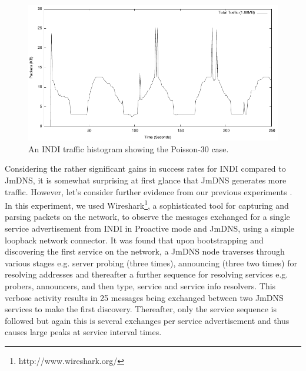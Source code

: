 \begin{figure}[htb]
\centering
\includegraphics[scale=1.0]{indi30packet-distribution.pdf}
\caption{An INDI traffic histogram showing the Poisson-30 case.   } 
\label{indi:fig:indi-30-traffic}
\end{figure}


 Considering the rather significant gains in success rates for INDI compared to JmDNS, it is somewhat surprising at first glance that JmDNS generates more traffic.  However, let's consider further evidence from our previous experiments \cite{Macker2011}.  In this experiment, we used Wireshark\footnote{http://www.wireshark.org/}, a sophisticated tool for capturing and parsing packets on the network, to observe the messages exchanged for a single service advertisement from INDI in Proactive mode and JmDNS, using a simple loopback network connector.  It was found that upon bootstrapping and discovering the first service on the network, a JmDNS node traverses through various stages e.g. server probing (three times), announcing (three two times) for resolving addresses and thereafter a further sequence for resolving services e.g. probers, announcers, and then type, service and service info resolvers.   This verbose activity results in 25 messages being exchanged between two JmDNS services to make the first discovery.  Thereafter, only the service sequence is followed but again this is several exchanges per service advertisement and thus causes large peaks at service interval times.  
 
